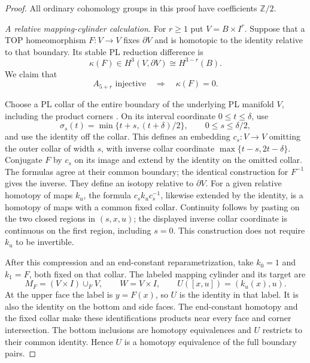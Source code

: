 \begin{proof}
All ordinary cohomology groups in this proof have
coefficients $\mathbb Z/2$.

\emph{A relative mapping-cylinder calculation.}
For $r\geq1$ put $V=B\times I^r$.  Suppose that a TOP
homeomorphism $F:V\to V$ fixes $\partial V$ and is
homotopic to the identity relative to that boundary.
Its stable PL reduction difference is
\[
 \kappa(F)\in H^3(V,\partial V)\cong H^{3-r}(B).
\]
We claim that
\begin{equation}\label{eq:aspherical-four-relative-zero-lemma}
 A_{5+r}\text{ injective}\quad\Longrightarrow\quad
 \kappa(F)=0.
\end{equation}

Choose a PL collar of the entire boundary of the
underlying PL manifold $V$, including the product corners
\cite[Theorem~2.25 and Corollary~2.26,
pp.~24--26]{RourkeSanderson1972}.
On its interval coordinate $0\leq t\leq\delta$, use
\[
 \sigma_s(t)=\min\{t+s,(t+\delta)/2\},
 \qquad 0\leq s\leq\delta/2,
\]
and use the identity off the collar.  This defines an
embedding $c_s:V\to V$ omitting the outer collar of
width $s$, with inverse collar coordinate
$\max\{t-s,2t-\delta\}$.  Conjugate $F$ by $c_s$ on
its image and extend by the identity on the omitted
collar.  The formulas agree at their common boundary;
the identical construction for $F^{-1}$ gives the inverse.
They define an isotopy relative to $\partial V$.
For a given relative homotopy of maps $k_u$, the formula
$c_sk_uc_s^{-1}$, likewise extended by the identity,
is a homotopy of maps with a common fixed collar.
Continuity follows by pasting on the two closed regions
in $(s,x,u)$; the displayed inverse collar coordinate
is continuous on the first region, including $s=0$.
This construction does not require $k_u$ to be invertible.

After this compression and an end-constant reparametrization,
take $k_0=1$ and $k_1=F$, both fixed on that collar.
The labeled mapping cylinder and its target are
\[
 M_F=(V\times I)\cup_FV,\qquad W=V\times I,
 \qquad U([x,u])=(k_u(x),u).
\]
At the upper face the label is $y=F(x)$, so $U$ is
the identity in that label.  It is also the identity
on the bottom and side faces.  The end-constant
homotopy and the fixed collar make these identifications
products near every face and corner intersection.
The bottom inclusions are homotopy equivalences and
$U$ restricts to their common identity.  Hence $U$ is
a homotopy equivalence of the full boundary pairs.


\end{proof}
